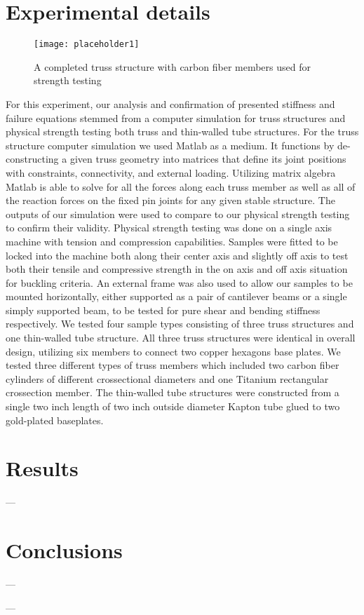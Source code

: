\documentclass[final]{svjour2}
\begin{document}
\section{Experimental details}
\begin{figure}
\begin{center}
\texttt{[image: placeholder1]}
\end{center}
\caption{A completed truss structure with carbon fiber members used for strength testing}
\label{compare}
\end{figure}
For this experiment, our analysis and confirmation of presented stiffness and failure equations stemmed from a computer simulation for truss structures and physical strength testing both truss and thin-walled tube structures.  For the truss structure computer simulation we used Matlab as a medium.  It functions by de-constructing a given truss geometry into matrices that define its joint positions with constraints, connectivity, and external loading.  Utilizing matrix algebra Matlab is able to solve for all the forces along each truss member as well as all of the reaction forces on the fixed pin joints for any given stable structure.  The outputs of our simulation were used to compare to our physical strength testing to confirm their validity.  Physical strength testing was done on a single axis machine with tension and compression capabilities. Samples were fitted to be locked into the machine both along their center axis and slightly off axis to test both their tensile and compressive strength in the on axis and off axis situation for buckling criteria.  An external frame was also used to allow our samples to be mounted horizontally, either supported as a pair of cantilever beams or a single simply supported beam, to be tested for pure shear and bending stiffness respectively.  We tested four sample types consisting of three truss structures and one thin-walled tube structure.  All three truss structures were identical in overall design, utilizing six members to connect two copper hexagons base plates.  We tested three different types of truss members which included two carbon fiber cylinders of different crossectional diameters and one Titanium rectangular crossection member. The thin-walled tube structures were constructed from a single two inch length of two inch outside diameter Kapton tube glued to two gold-plated baseplates. 


\section{Results}
---

\section{Conclusions}
--- 

\begin{acknowledgements}
---
\end{acknowledgements}

\pagebreak

\begin{thebibliography}{99}

\end{thebibliography}
\end{document}
